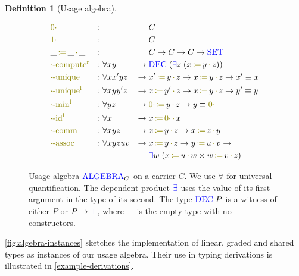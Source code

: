 \documentclass[sigplan,10pt,anonymous,review]{acmart}
\theoremstyle{definition}
\newtheorem{nidefinition}{Definition}
\newcommand{\type}[1]{\textcolor{blue}{\operatorname{#1}}}
\newcommand{\func}[1]{\textcolor{olive}{\operatorname{#1}}}
\newcommand{\op}[3]{#1 \, \func{\coloneqq} \, #2 \, \func{\cdot} \, #3}
\newcommand{\zero}{\func{0\cdot}}
\newcommand{\one}{\func{1\cdot}}
\newcommand{\Set}{\type{SET}}
\newcommand{\Algebra}{\type{ALGEBRA}}
\begin{document}
\begin{nidefinition}[Usage algebra]
  \begin{figure}[h]
  \begin{equation*}
  \begin{aligned}
    &\zero                   &:{} &                 &        & C \\
    &\one                    &:{} &                 &        & C \\
    &\op{\_}{\_}{\_}         &:{} &                 &        & C \to C \to C \to \Set \\
    &\func{\cdot-compute^r}  &:{} &\forall x y       & \to \; & \type{DEC} \; (\type{\exists} z  \; (\op{x}{y}{z})) \\
    &\func{\cdot-unique}     &:{} &\forall x x' y z  & \to \; & \op{x'}{y}{z} \to \op{x}{y}{z} \to x' \equiv x \\
    &\func{\cdot-unique^l}   &:{} &\forall x y y' z  & \to \; & \op{x}{y'}{z} \to \op{x}{y}{z} \to y' \equiv y \\
    &\func{\cdot-min^l}      &:{} &\forall y z        & \to \; & \op{\zero}{y}{z} \to y \equiv \zero \\
    &\func{\cdot-id^l}       &:{} &\forall x         & \to \; & \op{x}{\zero}{x} \\
    &\func{\cdot-comm}       &:{} &\forall x y z     & \to \; & \op{x}{y}{z} \to \op{x}{z}{y} \\
    &\func{\cdot-assoc}      &:{} &\forall x y z u v & \to \; & \op{x}{y}{z} \to \op{y}{u}{v} \to \\
    &                        &    &                  &        & \type{\exists} w  \; (\op{x}{u}{w} \times \op{w}{v}{z})
  \end{aligned}
  \end{equation*}
  \caption{
    Usage algebra $\Algebra_C$ on a carrier $C$.
    We use $\forall$ for universal quantification.
    The dependent product $\type{\exists}$ uses the value of its first argument in the type of its second.
    The type $\type{DEC} \; P$ is a witness of either $P$ or $P \to \type{\bot}$, where $\type{\bot}$ is the empty type with no constructors.
  }
  \label{fig:multiplicities}
  \end{figure}
\end{nidefinition}

\autoref{fig:algebra-instances} sketches the implementation of linear, graded and shared types as instances of our usage algebra.
Their use in typing derivations is illustrated in \autoref{example-derivations}.
\end{document}
